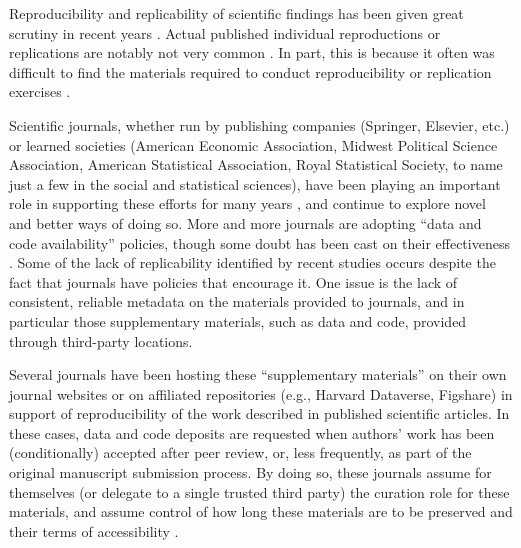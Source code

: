 Reproducibility and replicability of scientific findings has been given great scrutiny in recent years \parencite{CamererEvaluatingreplicabilitylaboratory2016,Collaboration2015-ev,Klein2014,FanelliOpinionsciencereally2018}.
%
Actual published individual reproductions or replications are notably not very common \parencite[in economics, see][]{BellMiller2013b,Duvendack2017}. In part, this is because it often was difficult to find the materials required to conduct reproducibility or replication exercises \parencite{Dewald1986,McCullough2006,McCullough03}.  

Scientific journals, whether run by publishing companies (Springer, Elsevier, etc.) or learned societies (American Economic Association, Midwest Political Science Association, American Statistical Association, Royal Statistical Society, to name just a few in the social and statistical sciences), have been playing an important role in supporting these efforts for many years \parencite{stodden_enhancing_2016}, and continue to explore novel and better ways of doing so. More and more journals are adopting ``data and code availability'' policies, though some doubt has been cast on their effectiveness \parencite{stodden_toward_2013,Stoddenempiricalanalysisjournal2018,Hoeffler2017}. Some of the lack of replicability identified by recent studies \parencite{Hoeffler2017a,Chang2017,ChangLi2015,CamererEvaluatingreplicabilitylaboratory2016,Stoddenempiricalanalysisjournal2018}  occurs despite the fact that journals have  policies that encourage it. One issue is the lack of consistent, reliable metadata on the materials provided to journals, and in particular those supplementary materials, such as data and code, provided through third-party locations.

Several journals have been hosting these ``supplementary materials'' on their own journal websites or on affiliated repositories (e.g., Harvard Dataverse, Figshare) in support of reproducibility of the work described in published scientific articles. In these cases, data and code deposits are requested when authors' work has been (conditionally) accepted after peer review, or, less frequently, as part of the original manuscript submission process. By doing so, these journals assume for themselves (or delegate to a single trusted third party) the curation role for these materials, and assume control of how long these materials are to be preserved and their terms of accessibility .

